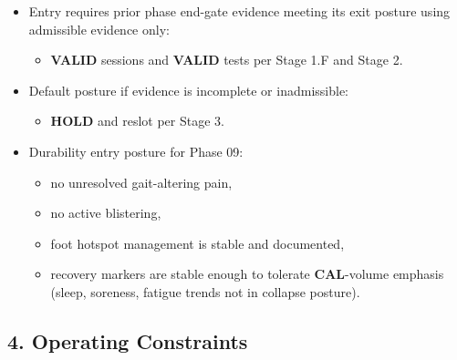 \documentclass[10pt]{article}
\begin{document}
\begin{itemize}
\item Entry requires prior phase end-gate evidence meeting its exit posture using admissible evidence only:
  \begin{itemize}
  \item \textbf{VALID} sessions and \textbf{VALID} tests per Stage 1.F and Stage 2.
  \end{itemize}
\item Default posture if evidence is incomplete or inadmissible:
  \begin{itemize}
  \item \textbf{HOLD} and reslot per Stage 3.
  \end{itemize}
\item Durability entry posture for Phase 09:
  \begin{itemize}
  \item no unresolved gait-altering pain,
  \item no active blistering,
  \item foot hotspot management is stable and documented,
  \item recovery markers are stable enough to tolerate \textbf{CAL}-volume emphasis (sleep, soreness, fatigue trends not in collapse posture).
  \end{itemize}
\end{itemize}

\subsection*{4. Operating Constraints}
\end{document}
